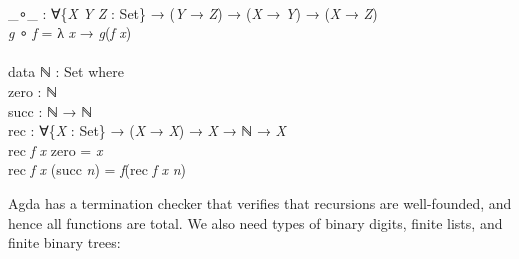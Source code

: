 \documentclass{entcs} \usepackage{prentcsmacro}
\newcommand{\AgdaFontStyle}[1]{\textsf{#1}}
\newcommand{\AgdaBoundFontStyle}[1]{\textit{#1}}
\newcommand{\AgdaKeyword}     [1]
    {\AgdaFontStyle{\textcolor{AgdaKeyword}{#1}}}
\newcommand{\AgdaSymbol}      [1]{\textcolor{AgdaSymbol}{#1}}
\newcommand{\AgdaPrimitiveType}[1]
    {\AgdaFontStyle{\textcolor{AgdaPrimitiveType}{#1}}}
\newcommand{\AgdaBound}    [1]{\AgdaBoundFontStyle{\textcolor{AgdaBound}{#1}}}
\newcommand{\AgdaInductiveConstructor}[1]
    {\AgdaFontStyle{\textcolor{AgdaInductiveConstructor}{#1}}}
\newcommand{\AgdaDatatype} [1]{\AgdaFontStyle{\textcolor{AgdaDatatype}{#1}}}
\newcommand{\AgdaFunction} [1]{\AgdaFontStyle{\textcolor{AgdaFunction}{#1}}}
\newcommand{\AgdaIndent}[1]{\quad}
\newcommand{\AgdaCodeStyle}{\small}
\newenvironment{code}%
{\noindent\AgdaCodeStyle\pboxed}%
{\endpboxed\par\noindent%
\ignorespacesafterend}
\begin{document}
\begin{code}\>\<%
\\
\>\AgdaFunction{\_∘\_} \AgdaSymbol{:} \AgdaSymbol{∀\{}\AgdaBound{X} \AgdaBound{Y} \AgdaBound{Z} \AgdaSymbol{:} \AgdaPrimitiveType{Set}\AgdaSymbol{\}} \AgdaSymbol{→} \AgdaSymbol{(}\AgdaBound{Y} \AgdaSymbol{→} \AgdaBound{Z}\AgdaSymbol{)} \AgdaSymbol{→} \AgdaSymbol{(}\AgdaBound{X} \AgdaSymbol{→} \AgdaBound{Y}\AgdaSymbol{)} \AgdaSymbol{→} \AgdaSymbol{(}\AgdaBound{X} \AgdaSymbol{→} \AgdaBound{Z}\AgdaSymbol{)}\<%
\\
\>\AgdaBound{g} \AgdaFunction{∘} \AgdaBound{f} \AgdaSymbol{=} \AgdaSymbol{λ} \AgdaBound{x} \AgdaSymbol{→} \AgdaBound{g}\AgdaSymbol{(}\AgdaBound{f} \AgdaBound{x}\AgdaSymbol{)}\<%
\\
%
\\
\>\AgdaKeyword{data} \AgdaDatatype{ℕ} \AgdaSymbol{:} \AgdaPrimitiveType{Set} \AgdaKeyword{where} \<[19]%
\>[19]\<%
\\
\>[0]\AgdaIndent{2}{}\<[2]%
\>[2]\AgdaInductiveConstructor{zero} \AgdaSymbol{:} \AgdaDatatype{ℕ} \<[24]%
\>[24]\<%
\\
\>[0]\AgdaIndent{2}{}\<[2]%
\>[2]\AgdaInductiveConstructor{succ} \AgdaSymbol{:} \AgdaDatatype{ℕ} \AgdaSymbol{→} \AgdaDatatype{ℕ} \<[21]%
\>[21]\<%
\\
\>\AgdaFunction{rec} \AgdaSymbol{:} \AgdaSymbol{∀\{}\AgdaBound{X} \AgdaSymbol{:} \AgdaPrimitiveType{Set}\AgdaSymbol{\}} \AgdaSymbol{→} \AgdaSymbol{(}\AgdaBound{X} \AgdaSymbol{→} \AgdaBound{X}\AgdaSymbol{)} \AgdaSymbol{→} \AgdaBound{X} \AgdaSymbol{→} \AgdaDatatype{ℕ} \AgdaSymbol{→} \AgdaBound{X}\<%
\\
\>\AgdaFunction{rec} \AgdaBound{f} \AgdaBound{x} \<[9]%
\>[9]\AgdaInductiveConstructor{zero} \<[17]%
\>[17]\AgdaSymbol{=} \AgdaBound{x}\<%
\\
\>\AgdaFunction{rec} \AgdaBound{f} \AgdaBound{x} \AgdaSymbol{(}\AgdaInductiveConstructor{succ} \AgdaBound{n}\AgdaSymbol{)} \AgdaSymbol{=} \AgdaBound{f}\AgdaSymbol{(}\AgdaFunction{rec} \AgdaBound{f} \AgdaBound{x} \AgdaBound{n}\AgdaSymbol{)}\<%
\\
\>\<\end{code}
Agda has a termination checker that verifies that recursions are
well-founded, and hence all functions are total. We also need types of
binary digits, finite lists, and finite binary trees:
\end{document}
